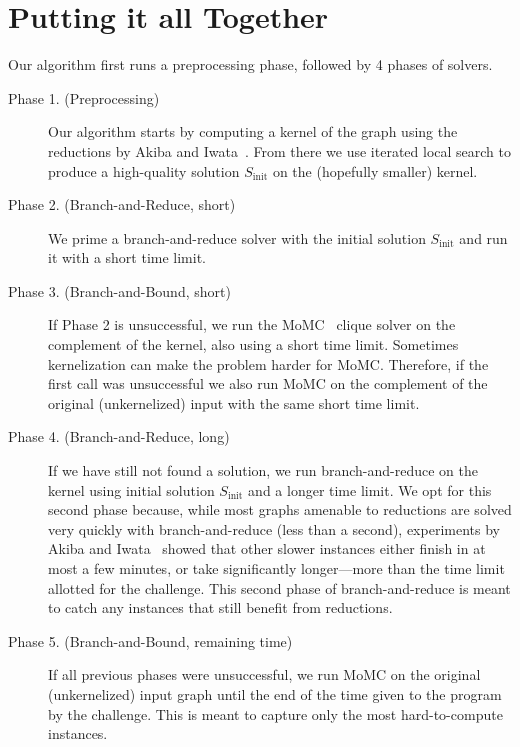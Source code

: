 \documentclass[twoside,leqno,twocolumn]{article}
\begin{document}
\section{Putting it all Together}
Our algorithm first runs a preprocessing phase, followed by 4 phases of solvers.


%

\begin{description}
\item[Phase 1. (Preprocessing)] Our algorithm starts by computing a kernel of the graph using the reductions by Akiba and Iwata~\cite{akiba-tcs-2016}. 
From there we use iterated local search to produce a high-quality solution $S_{\textrm{init}}$ on the (hopefully smaller) kernel. 
\item[Phase 2. (Branch-and-Reduce, short)]
We prime a branch-and-reduce solver with the initial solution $S_{\textrm{init}}$ and run it with a short time limit.
\item[Phase 3. (Branch-and-Bound, short)]
If Phase 2 is unsuccessful, we run the MoMC~\cite{DBLP:journals/cor/LiJM17} clique solver on the complement of the kernel, also using a short time limit. Sometimes kernelization can make the problem harder for MoMC. Therefore, if the first call was unsuccessful we also run MoMC on the complement of the original (unkernelized) input with the same short time limit.

\item[Phase 4. (Branch-and-Reduce, long)]
If we have still not found a solution, we run branch-and-reduce on the kernel using initial solution $S_{\textrm{init}}$ and a longer time limit. We opt for this second phase because, while most graphs amenable to reductions are solved very quickly with branch-and-reduce (less than a second),
experiments by Akiba and Iwata~\cite{akiba-tcs-2016} showed that other slower instances either finish in at most a few minutes, or take significantly longer---more than the time limit allotted for the challenge. This second phase of branch-and-reduce is meant to catch any instances that still benefit from reductions.

\item[Phase 5. (Branch-and-Bound, remaining time)]
If all previous phases were unsuccessful, we run MoMC on the original (unkernelized) input graph until the end of the time given to the program by the challenge. This is meant to capture only the most hard-to-compute instances.
\end{description}
\end{document}
